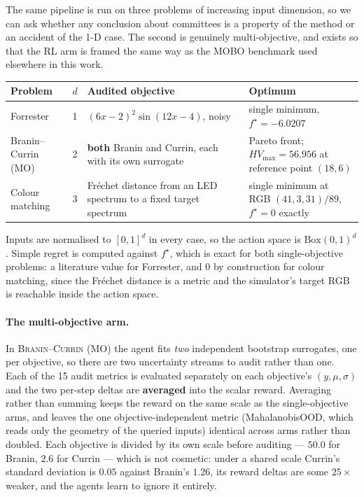 \documentclass[11pt]{article}
\begin{document}
The same pipeline is run on three problems of increasing input dimension, so we can ask whether any conclusion about committees is a property of the method or an accident of the 1-D case. The second is genuinely multi-objective, and exists so that the RL arm is framed the same way as the MOBO benchmark used elsewhere in this work.

\begin{center}
\small
\begin{tabular}{p{} p{} p{} p{}}
\toprule
\textbf{Problem} & \textbf{$d$} & \textbf{Audited objective} & \textbf{Optimum} \\
\midrule
Forrester & 1 & $(6x-2)^2\sin(12x-4)$, noisy & single minimum, $f^\star = -6.0207$ \\
\midrule
Branin--Currin (MO) & 2 & \textbf{both} Branin and Currin, each with its own surrogate & Pareto front; $HV_{\max} = 56.956$ at reference point $(18, 6)$ \\
\midrule
Colour matching & 3 & Fr\'echet distance from an LED spectrum to a fixed target spectrum & single minimum at RGB $(41,3,31)/89$, $f^\star = 0$ exactly \\
\bottomrule
\end{tabular}
\end{center}

Inputs are normalised to $[0,1]^d$ in every case, so the action space is $\mathrm{Box}(0,1)^d$. Simple regret is computed against $f^\star$, which is exact for both single-objective problems: a literature value for Forrester, and $0$ by construction for colour matching, since the Fr\'echet distance is a metric and the simulator's target RGB is reachable inside the action space.

\paragraph{The multi-objective arm.} In \textsc{Branin--Currin (MO)} the agent fits \emph{two} independent bootstrap surrogates, one per objective, so there are two uncertainty streams to audit rather than one. Each of the 15 audit metrics is evaluated separately on each objective's $(y, \mu, \sigma)$ and the two per-step deltas are \textbf{averaged} into the scalar reward. Averaging rather than summing keeps the reward on the same scale as the single-objective arms, and leaves the one objective-independent metric (MahalanobisOOD, which reads only the geometry of the queried inputs) identical across arms rather than doubled. Each objective is divided by its own scale before auditing --- $50.0$ for Branin, $2.6$ for Currin --- which is not cosmetic: under a shared scale Currin's standard deviation is $0.05$ against Branin's $1.26$, its reward deltas are some $25\times$ weaker, and the agents learn to ignore it entirely.
\end{document}
